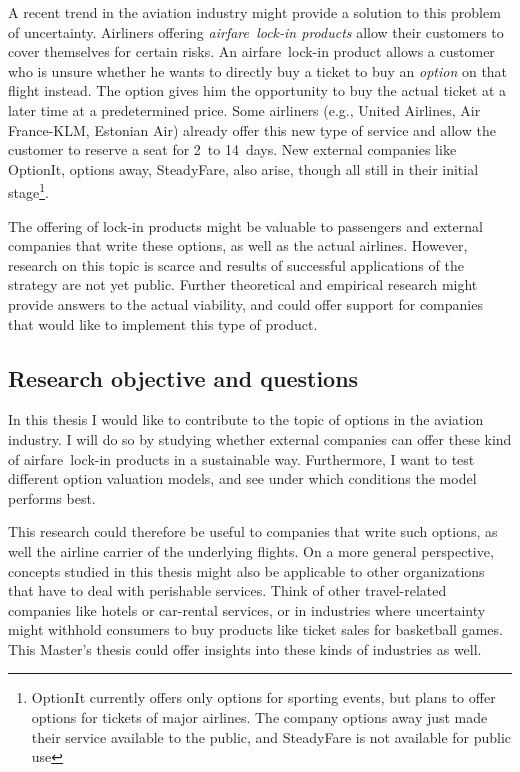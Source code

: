 A recent trend in the aviation industry might provide a solution to this problem of uncertainty. Airliners offering \emph{airfare~lock-in products} allow their customers to cover themselves for certain risks. An airfare~lock-in product allows a customer who is unsure whether he wants to directly buy a ticket to buy an \emph{option} on that flight instead. The option gives him the opportunity to buy the actual ticket at a later time at a predetermined price. Some airliners (e.g., United Airlines, Air France-KLM, Estonian Air) already offer this new type of service and allow the customer to reserve a seat for 2~to 14~days. New external companies like OptionIt, options away, SteadyFare, also arise, though all still in their initial stage\footnote{OptionIt currently offers only options for sporting events, but plans to offer options for tickets of major airlines. The company options away just made their service available to the public, and SteadyFare is not available for public use}.

The offering of lock-in products might be valuable to passengers and external companies that write these options, as well as the actual airlines. However, research on this topic is scarce and results of successful applications of the strategy are not yet public. Further theoretical and empirical research might provide answers to the actual viability, and could offer support for companies that would like to implement this type of product.

\subsection{Research objective and questions}
In this thesis I would like to contribute to the topic of options in the aviation industry. I will do so by studying whether external companies can offer these kind of airfare~lock-in products in a sustainable way. Furthermore, I want to test different option valuation models, and see under which conditions the model performs best.

This research could therefore be useful to companies that write such options, as well the airline carrier of the underlying flights. On a more general perspective, concepts studied in this thesis might also be applicable to other organizations that have to deal with perishable services. Think of other travel-related companies like hotels or car-rental services, or in industries where uncertainty might withhold consumers to buy products like ticket sales for basketball games. This Master's thesis could offer insights into these kinds of industries as well.

